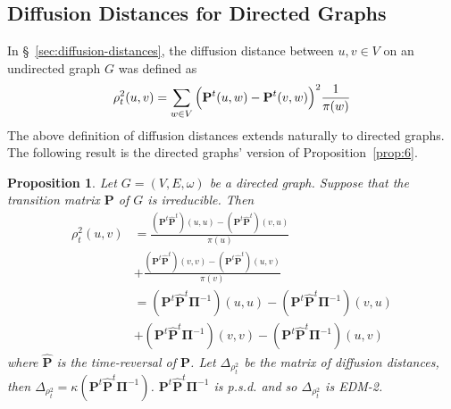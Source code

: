 \documentclass[10pt,twocolumn]{article}
\newtheorem{proposition}[theorem]{Proposition}
\numberwithin{equation}{section}
\begin{document}
\subsection{Diffusion Distances for Directed Graphs}
\label{sec:diff-dist-direct}
In \S~\ref{sec:diffusion-distances}, the diffusion distance between $u,v
\in V$ on an undirected graph $G$ was defined as
\begin{equation*}
  \rho^{2}_{t}(u,v) = \sum_{w \in V}{\Bigl(\mathbf{P}^{t}(u,w) -
      \mathbf{P}^{t}(v,w)\Bigr)^2 \frac{1}{\pi(w)}}
\end{equation*}
The above definition of diffusion distances extends naturally to
directed graphs. The following result is the directed graphs' version
of Proposition~\ref{prop:6}.
\begin{proposition}
  \label{prop:11}
  Let $G = (V,E,\omega)$ be a directed graph. Suppose that
  the transition matrix $\mathbf{P}$ of $G$ is irreducible. Then
  \begin{equation*}
     \begin{split}
      \rho_{t}^{2}(u,v) &= \frac{(\mathbf{P}^{t}\hat{\mathbf{P}}^{t})(u,u) -
        (\mathbf{P}^{t}\hat{\mathbf{P}}^{t})(v,u)}{\pi(u)} \\ &+
      \frac{(\mathbf{P}^{t}\hat{\mathbf{P}}^{t})(v,v) -
        (\mathbf{P}^{t}\hat{\mathbf{P}}^{t})(u,v)}{\pi(v)}  \\
      &= (\mathbf{P}^{t}\hat{\mathbf{P}}^{t}\bm{\Pi}^{-1})(u,u) -
      (\mathbf{P}^{t}\hat{\mathbf{P}}^{t}\bm{\Pi}^{-1})(v,u) \\
      &+ (\mathbf{P}^{t}\hat{\mathbf{P}}^{t}\bm{\Pi}^{-1})(v,v) -
      (\mathbf{P}^{t}\hat{\mathbf{P}}^{t}\bm{\Pi}^{-1})(u,v)
    \end{split}
  \end{equation*}
  where $\hat{\mathbf{P}}$ is the time-reversal of $\mathbf{P}$. Let
  $\Delta_{\rho_t^2}$ be the matrix of diffusion distances,
  then $\Delta_{\rho_t^2} =
  \kappa(\mathbf{P}^{t}\hat{\mathbf{P}}^{t}\bm{\Pi}^{-1})$. 
  $\mathbf{P}^{t}\hat{\mathbf{P}}^{t}\bm{\Pi}^{-1}$
  is p.s.d. and so $\Delta_{\rho_t^2}$ is EDM-2.
\end{proposition}
\end{document}
